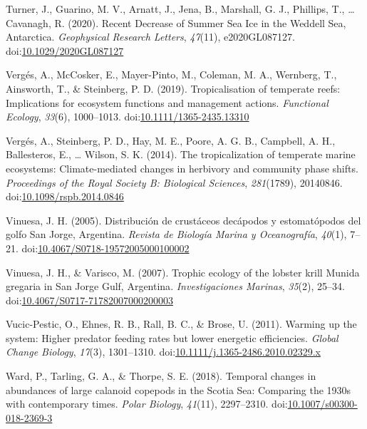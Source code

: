 \documentclass[
]{article}
\newlength{\cslhangindent}
\newlength{\cslentryspacingunit} %
\newenvironment{CSLReferences}[2] %
 {%
  \setlength{\parindent}{0pt}
  \ifodd #1
  \let\oldpar\par
  \def\par{\hangindent=\cslhangindent\oldpar}
  \fi
  \setlength{\parskip}{#2\cslentryspacingunit}
 }%
 {}
\begin{document}
\begin{CSLReferences}{1}{0}
\leavevmode{}%
Turner, J., Guarino, M. V., Arnatt, J., Jena, B., Marshall, G. J.,
Phillips, T., \ldots{} Cavanagh, R. (2020). Recent {Decrease} of {Summer
Sea Ice} in the {Weddell Sea}, {Antarctica}. \emph{Geophysical Research
Letters}, \emph{47}(11), e2020GL087127.
doi:\href{https://doi.org/10.1029/2020GL087127}{10.1029/2020GL087127}

\leavevmode{}%
Vergés, A., McCosker, E., Mayer-Pinto, M., Coleman, M. A., Wernberg, T.,
Ainsworth, T., \& Steinberg, P. D. (2019). Tropicalisation of temperate
reefs: {Implications} for ecosystem functions and management actions.
\emph{Functional Ecology}, \emph{33}(6), 1000--1013.
doi:\href{https://doi.org/10.1111/1365-2435.13310}{10.1111/1365-2435.13310}

\leavevmode{}%
Vergés, A., Steinberg, P. D., Hay, M. E., Poore, A. G. B., Campbell, A.
H., Ballesteros, E., \ldots{} Wilson, S. K. (2014). The tropicalization
of temperate marine ecosystems: Climate-mediated changes in herbivory
and community phase shifts. \emph{Proceedings of the Royal Society B:
Biological Sciences}, \emph{281}(1789), 20140846.
doi:\href{https://doi.org/10.1098/rspb.2014.0846}{10.1098/rspb.2014.0846}

\leavevmode{}%
Vinuesa, J. H. (2005). Distribución de crustáceos decápodos y
estomatópodos del golfo {San Jorge}, {Argentina}. \emph{Revista de
Biología Marina y Oceanografía}, \emph{40}(1), 7--21.
doi:\href{https://doi.org/10.4067/S0718-19572005000100002}{10.4067/S0718-19572005000100002}

\leavevmode{}%
Vinuesa, J. H., \& Varisco, M. (2007). Trophic ecology of the lobster
krill {Munida} gregaria in {San Jorge Gulf}, {Argentina}.
\emph{Investigaciones Marinas}, \emph{35}(2), 25--34.
doi:\href{https://doi.org/10.4067/S0717-71782007000200003}{10.4067/S0717-71782007000200003}

\leavevmode{}%
Vucic-Pestic, O., Ehnes, R. B., Rall, B. C., \& Brose, U. (2011).
Warming up the system: Higher predator feeding rates but lower energetic
efficiencies. \emph{Global Change Biology}, \emph{17}(3), 1301--1310.
doi:\href{https://doi.org/10.1111/j.1365-2486.2010.02329.x}{10.1111/j.1365-2486.2010.02329.x}

\leavevmode{}%
Ward, P., Tarling, G. A., \& Thorpe, S. E. (2018). Temporal changes in
abundances of large calanoid copepods in the {Scotia Sea}: Comparing the
1930s with contemporary times. \emph{Polar Biology}, \emph{41}(11),
2297--2310.
doi:\href{https://doi.org/10.1007/s00300-018-2369-3}{10.1007/s00300-018-2369-3}


\end{CSLReferences}
\end{document}
